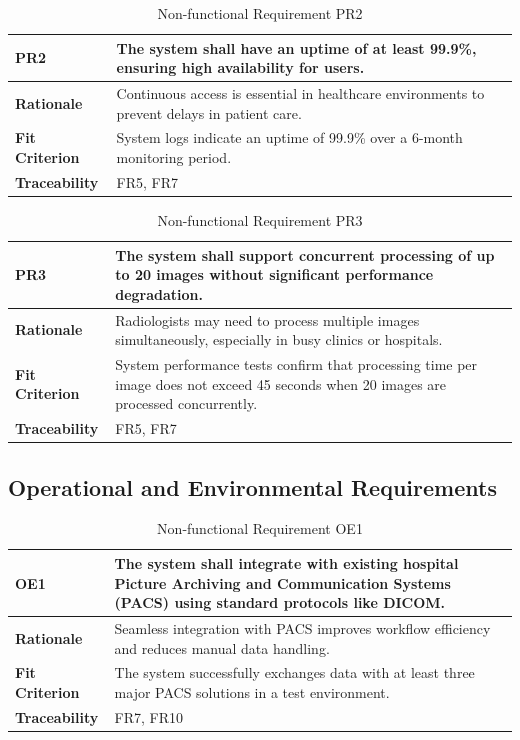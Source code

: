 \documentclass[12pt]{article}
\begin{document}
\begin{table}[h!]
\centering
{}
\begin{tabular}{|p{3.5cm}|p{11.5cm}|}
\hline
\rowcolor{gray!30}
\textbf{PR2} & The system shall have an uptime of at least 99.9\%, ensuring high availability for users. \\
\hline
\textbf{Rationale} & Continuous access is essential in healthcare environments to prevent delays in patient care. \\
\hline
\textbf{Fit Criterion} & System logs indicate an uptime of 99.9\% over a 6-month monitoring period. \\
\hline
\textbf{Traceability} & FR5, FR7 \\
\hline
\end{tabular}
\caption{Non-functional Requirement PR2}
\end{table}

\begin{table}[h!]
\centering
{}
\begin{tabular}{|p{3.5cm}|p{11.5cm}|}
\hline
\rowcolor{gray!30}
\textbf{PR3} & The system shall support concurrent processing of up to 20 images without significant performance degradation. \\
\hline
\textbf{Rationale} & Radiologists may need to process multiple images simultaneously, especially in busy clinics or hospitals. \\
\hline
\textbf{Fit Criterion} & System performance tests confirm that processing time per image does not exceed 45 seconds when 20 images are processed concurrently. \\
\hline
\textbf{Traceability} & FR5, FR7 \\
\hline
\end{tabular}
\caption{Non-functional Requirement PR3}
\end{table}
\clearpage
\subsection{Operational and Environmental Requirements}

\begin{table}[h!]
\centering
{}
\begin{tabular}{|p{3.5cm}|p{11.5cm}|}
\hline
\rowcolor{gray!30}
\textbf{OE1} & The system shall integrate with existing hospital Picture Archiving and Communication Systems (PACS) using standard protocols like DICOM. \\
\hline
\textbf{Rationale} & Seamless integration with PACS improves workflow efficiency and reduces manual data handling. \\
\hline
\textbf{Fit Criterion} & The system successfully exchanges data with at least three major PACS solutions in a test environment. \\
\hline
\textbf{Traceability} & FR7, FR10 \\
\hline
\end{tabular}
\caption{Non-functional Requirement OE1}
\end{table}
\end{document}
